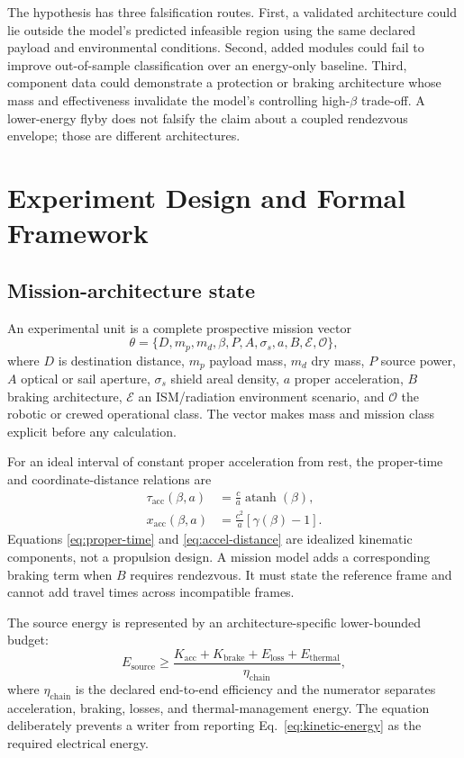 \documentclass[conference]{../../../../Conference-LaTeX-template_10-17-19/IEEEtran}
\begin{document}
The hypothesis has three falsification routes. First, a validated architecture could lie outside the model's predicted infeasible region using the same declared payload and environmental conditions. Second, added modules could fail to improve out-of-sample classification over an energy-only baseline. Third, component data could demonstrate a protection or braking architecture whose mass and effectiveness invalidate the model's controlling high-$\beta$ trade-off. A lower-energy flyby does not falsify the claim about a coupled rendezvous envelope; those are different architectures.

\section{Experiment Design and Formal Framework}
\subsection{Mission-architecture state}
An experimental unit is a complete prospective mission vector
\begin{equation}
\theta=\{D,m_p,m_d,\beta,P,A,\sigma_s,a,B,\mathcal{E},\mathcal{O}\},
\label{eq:architecture-vector}
\end{equation}
where $D$ is destination distance, $m_p$ payload mass, $m_d$ dry mass, $P$ source power, $A$ optical or sail aperture, $\sigma_s$ shield areal density, $a$ proper acceleration, $B$ braking architecture, $\mathcal{E}$ an ISM/radiation environment scenario, and $\mathcal{O}$ the robotic or crewed operational class. The vector makes mass and mission class explicit before any calculation.

For an ideal interval of constant proper acceleration from rest, the proper-time and coordinate-distance relations are
\begin{align}
\tau_{\mathrm{acc}}(\beta,a) &= \frac{c}{a}\operatorname{atanh}(\beta), \label{eq:proper-time}\\
x_{\mathrm{acc}}(\beta,a) &= \frac{c^2}{a}\left[\gamma(\beta)-1\right]. \label{eq:accel-distance}
\end{align}
Equations \eqref{eq:proper-time} and \eqref{eq:accel-distance} are idealized kinematic components, not a propulsion design. A mission model adds a corresponding braking term when $B$ requires rendezvous. It must state the reference frame and cannot add travel times across incompatible frames.

The source energy is represented by an architecture-specific lower-bounded budget:
\begin{equation}
E_{\mathrm{source}} \geq \frac{K_{\mathrm{acc}}+K_{\mathrm{brake}}+E_{\mathrm{loss}}+E_{\mathrm{thermal}}}{\eta_{\mathrm{chain}}},
\label{eq:source-energy}
\end{equation}
where $\eta_{\mathrm{chain}}$ is the declared end-to-end efficiency and the numerator separates acceleration, braking, losses, and thermal-management energy. The equation deliberately prevents a writer from reporting Eq.~\eqref{eq:kinetic-energy} as the required electrical energy.
\end{document}
